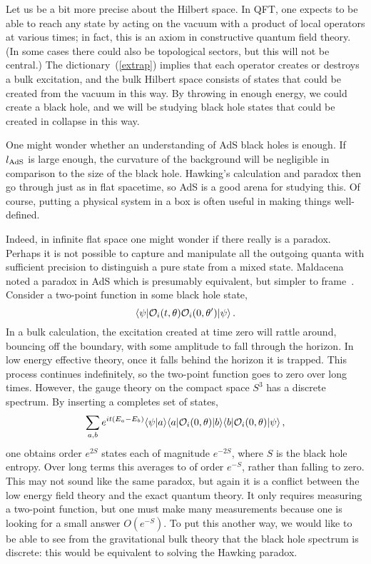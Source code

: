 \documentclass[12pt]{article}
\newcommand{\be}{\begin{equation}}
\newcommand{\ee}{\end{equation}}
\begin{document}
Let us be a bit more precise about the Hilbert space.  In QFT, one expects to be able to reach any state by acting on the vacuum with a product of local operators at various times; in fact, this is an axiom in constructive quantum field theory.  (In some cases there could also be topological sectors, but this will not be central.)  The dictionary~(\ref{extrap}) implies that each operator creates or destroys a bulk excitation, and the bulk Hilbert space consists of states that could be created from the vacuum in this way.  By throwing in enough energy, we could create a black hole, and  we will be studying black hole states that could be created in collapse in this way.  

One might wonder whether an understanding of AdS black holes is enough.  If $l_{\rm AdS}$ is large enough, the curvature of the background will be negligible in comparison to the size of the black hole.  Hawking's calculation and paradox then go through just as in flat spacetime, so AdS is a good arena for studying this.  Of course, putting a physical system in a box is often useful in making things well-defined. 

 Indeed, in infinite flat space one might wonder if there really is a paradox.  Perhaps it is not possible to capture and manipulate all the outgoing quanta with sufficient precision to distinguish a pure state from a mixed state.  Maldacena noted a paradox in AdS which is presumably equivalent, but simpler to frame~\cite{Maldacena:2001kr}.  Consider a two-point function in some black hole state,
\be
\langle \psi | {\cal O}_i(t,\theta)  {\cal O}_i(0,\theta') | \psi \rangle \,. \label{tpf}
\ee
In a bulk calculation, the excitation created at time zero will rattle around, bouncing off the boundary, with some amplitude to fall through the horizon.  In low energy effective theory, once it falls behind the horizon it is trapped.  This process continues indefinitely, so the two-point function goes to zero over long times.  However, the gauge theory on the compact space $S^3$ has a discrete spectrum.  By inserting a completes set of 
states,
\be
\sum_{a,b} e^{it(E_a - E_b)} \langle \psi |a \rangle \langle a| {\cal O}_i(0,\theta)  |b \rangle \langle b| {\cal O}_i(0,\theta)|  \psi \rangle \,, 
\ee
one obtains order $e^{2S}$ states each of magnitude $e^{-2S}$, where $S$ is the black hole entropy.  Over long terms this averages to of order $e^{-S}$, rather than falling to zero.  This may not sound like the same paradox, but again it is a conflict between the low energy field theory and the exact quantum theory.  It only requires measuring a two-point function, but one must make many measurements because one is looking for a small answer $O(e^{-S})$.  To put this another way, we would like to be able to see from the gravitational bulk theory that the black hole spectrum is discrete: this would be equivalent to solving the Hawking paradox.
\end{document}
